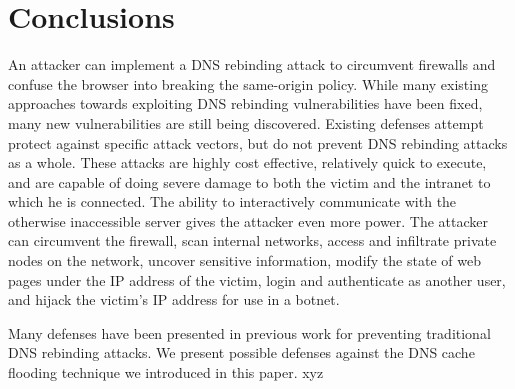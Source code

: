 \section{Conclusions}
\label{sec:conc}

An attacker can implement a DNS rebinding attack to circumvent firewalls and confuse the browser into breaking the same-origin policy. While many existing approaches towards exploiting DNS rebinding vulnerabilities have been fixed, many new vulnerabilities are still being discovered. Existing defenses attempt protect against specific attack vectors, but do not prevent DNS rebinding attacks as a whole. These attacks are highly cost effective, relatively quick to execute, and are capable of doing severe damage to both the victim and the intranet to which he is connected. The ability to interactively communicate with the otherwise inaccessible server gives the attacker even more power. The attacker can circumvent the firewall, scan internal networks, access and infiltrate private nodes on the network, uncover sensitive information, modify the state of web pages under the IP address of the victim, login and authenticate as another user, and hijack the victim's IP address for use in a botnet.

Many defenses have been presented in previous work for preventing traditional DNS rebinding attacks. We present possible defenses against the DNS cache flooding technique we introduced in this paper. xyz
